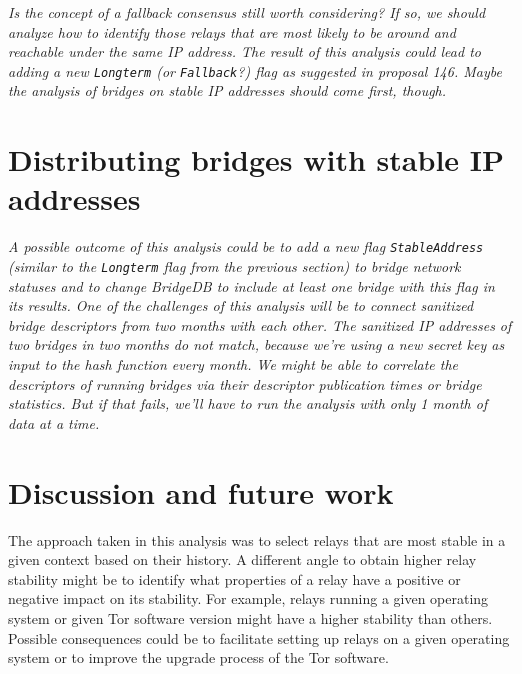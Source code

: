 \documentclass{article}
\begin{document}
{\it
Is the concept of a fallback consensus still worth considering?
If so, we should analyze how to identify those relays that are most likely
to be around and reachable under the same IP address.
The result of this analysis could lead to adding a new \texttt{Longterm}
(or \texttt{Fallback}?) flag as suggested in proposal 146.
Maybe the analysis of bridges on stable IP addresses should come first,
though.
}

\section{Distributing bridges with stable IP addresses}

{\it
A possible outcome of this analysis could be to add a new flag
\texttt{StableAddress} (similar to the \texttt{Longterm} flag from the
previous section) to bridge network statuses and to change BridgeDB to
include at least one bridge with this flag in its results.
One of the challenges of this analysis will be to connect sanitized bridge
descriptors from two months with each other.
The sanitized IP addresses of two bridges in two months do not match,
because we're using a new secret key as input to the hash function every
month.
We might be able to correlate the descriptors of running bridges via their
descriptor publication times or bridge statistics.
But if that fails, we'll have to run the analysis with only 1 month of
data at a time.
}

\section{Discussion and future work}

The approach taken in this analysis was to select relays that are most
stable in a given context based on their history.
A different angle to obtain higher relay stability might be to identify
what properties of a relay have a positive or negative impact on its
stability.
For example, relays running a given operating system or given Tor software
version might have a higher stability than others.
Possible consequences could be to facilitate setting up relays on a given
operating system or to improve the upgrade process of the Tor software.
\end{document}
